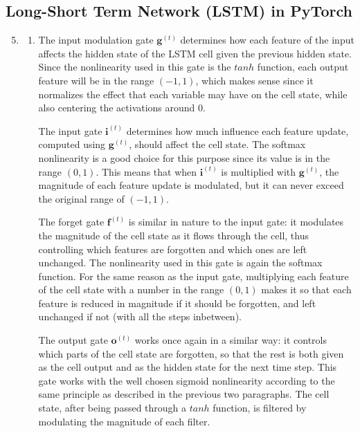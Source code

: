 \documentclass{article}
\begin{document}
\subsection{Long-Short Term Network (LSTM) in PyTorch}

\begin{enumerate}[label=\textbf{1.\arabic*}]
  \setcounter{enumi}{4}
  \item
  \begin{enumerate}[label=\textbf{(\alph*)}]
    \item
    The input modulation gate $\mathbf{g}^{(t)}$ determines how each feature of the input affects the hidden state of the LSTM cell given the previous hidden state. Since the nonlinearity used in this gate is the $tanh$ function, each output feature will be in the range $(-1, 1)$, which makes sense since it normalizes the effect that each variable may have on the cell state, while also centering the activations around $0$.

    The input gate $\mathbf{i}^{(t)}$ determines how much influence each feature update, computed using $\mathbf{g}^{(t)}$, should affect the cell state. The softmax nonlinearity is a good choice for this purpose since its value is in the range $(0, 1)$. This means that when $\mathbf{i}^{(t)}$ is multiplied with $\mathbf{g}^{(t)}$, the magnitude of each feature update is modulated, but it can never exceed the original range of $(-1, 1)$.

    The forget gate $\mathbf{f}^{(t)}$ is similar in nature to the input gate: it modulates the magnitude of the cell state as it flows through the cell, thus controlling which features are forgotten and which ones are left unchanged. The nonlinearity used in this gate is again the softmax function. For the same reason as the input gate, multiplying each feature of the cell state with a number in the range $(0, 1)$ makes it so that each feature is reduced in magnitude if it should be forgotten, and left unchanged if not (with all the steps inbetween).

    The output gate $\mathbf{o}^{(t)}$ works once again in a similar way: it controls which parts of the cell state are forgotten, so that the rest is both given as the cell output and as the hidden state for the next time step. This gate works with the well chosen sigmoid nonlinearity according to the same principle as described in the previous two paragraphs. The cell state, after being passed through a $tanh$ function, is filtered by modulating the magnitude of each filter.


\end{enumerate}
\end{enumerate}
\end{document}
